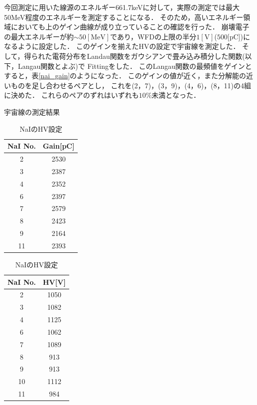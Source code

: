 今回測定に用いた線源のエネルギー661.7keVに対して，実際の測定では最大50MeV程度のエネルギーを測定することになる．
そのため，高いエネルギー領域においても上のゲイン曲線が成り立っていることの確認を行った．
崩壊電子の最大エネルギーが約$\sim 50[\mathrm{MeV}]$であり，WFDの上限の半分$1[\mathrm{V}]$($500[\mathrm{pC}$])になるように設定した．%
このゲインを揃えたHVの設定で宇宙線を測定した．
そして，得られた電荷分布をLandau関数をガウシアンで畳み込み積分した関数(以下，Langau関数とよぶ)で
Fittingをした．
このLangau関数の最頻値をゲインとすると，表\ref{nai_gain}のようになった．
このゲインの値が近く，また分解能の近いものを足し合わせるペアとし，
これを(2，7)，(3，9)，(4，6)，(8，11)の4組に決めた．
これらのペアのずれはいずれも$10\%$未満となった．%


\begin{table}[H]
  \begin{minipage}[t]{0.45\textwidth}
    \begin{center}
    \caption{宇宙線の測定結果}\label{nai_gain}
      \begin{tabular}{|c|c|}\hline
        NaI No. & Gain[pC]\\ \hline \hline
        2 & 2530 \\ \hline
        3 &2387 \\ \hline
        4 &2352 \\ \hline
        6 &2397 \\ \hline
        7  &2579 \\ \hline
        8  &2423 \\ \hline
        9  &2164 \\ \hline
        11  &2393 \\ \hline
      \end{tabular}
    \end{center}
  \end{minipage}
  \hfill
  \begin{minipage}[t]{0.45\textwidth}
    \begin{center}
    \caption{NaIのHV設定}\label{HV}
      \begin{tabular}{|c|c|}\hline
      NaI No.&HV[V]\\ \hline \hline
      2 & 1050 \\ \hline
      3 & 1082 \\ \hline
      4 & 1125 \\ \hline
      6 & 1062 \\ \hline
      7 & 1089 \\ \hline
      8 & 913 \\ \hline
      9 & 913 \\ \hline
      10 & 1112 \\ \hline
      11 & 984 \\ \hline
      \end{tabular}
    \end{center}
  \end{minipage}
\end{table}

